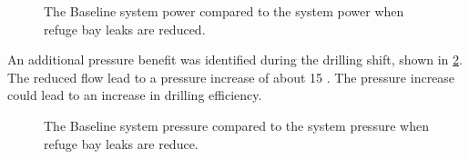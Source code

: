 	\par
	\begin{figure}[h]
		\centering
		
		\caption{The Baseline system power compared to the system power when refuge bay leaks are reduced.}
		\label{fig: RefugeBay Power.}
	\end{figure}   
	An additional pressure benefit was identified during the drilling shift, shown in  \cref{fig: RefugeBay Pressures.}. The reduced flow lead to a pressure increase of about 15 . The pressure increase could lead to an increase in drilling efficiency.
	\begin{figure}[h]
		\centering
		
		\caption{The Baseline system pressure compared to the system pressure when refuge bay leaks are reduce.}
		\label{fig: RefugeBay Pressures.}
	\end{figure}  
